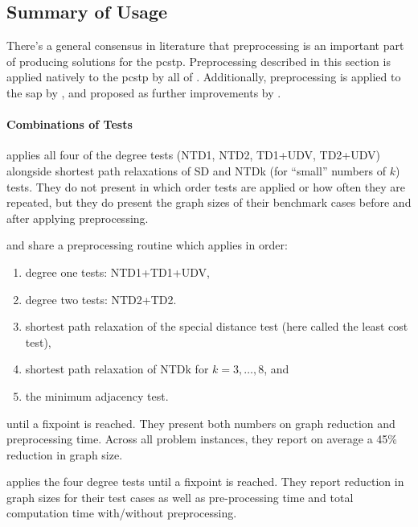  \subsection{Summary of Usage}\label{sec:pre:summary-usage}
There's a general consensus in literature that preprocessing is an important part of producing solutions
for the \gls{pcstp}. Preprocessing described in this section is applied natively to the \gls{pcstp}
by all of
\citet{lucena2004strong, Ljubic:2004:memetic, ljubic2005solving,akhmedov2016divide,gamrath2017scip}.
Additionally, preprocessing is applied to the \gls{sap} by \citet{leitner2016dual}, and proposed
as further improvements by \citet{fu2014knowledge}.

\paragraph{Combinations of Tests}

\citet{lucena2004strong} applies all four of the degree tests (NTD1, NTD2, TD1+UDV, TD2+UDV)
alongside shortest path relaxations of SD and NTDk (for ``small'' numbers of $k$)
tests. They do not
present in which order tests are applied or how often they are repeated, but they
do present the graph sizes of their benchmark cases before and after applying preprocessing.

\citet{Ljubic:2004:memetic} and \citet{ljubic2005solving} share a preprocessing routine
 which applies in order:
\begin{enumerate}
\item degree one tests: NTD1+TD1+UDV,
\item degree two tests: NTD2+TD2.
\item shortest path relaxation of the special distance test (here called the least cost test),
\item shortest path relaxation of NTDk for $k = 3,\ldots,8$, and
\item the minimum adjacency test.
\end{enumerate}
until a fixpoint is reached. They present both numbers on graph reduction and preprocessing
time. Across all problem instances, they report on average
a 45\% reduction in graph size.

\citet{akhmedov2016divide} applies the four degree tests until a fixpoint is reached. They
report reduction in graph sizes for their test cases as well as pre-processing time and
total computation time with/without preprocessing.

